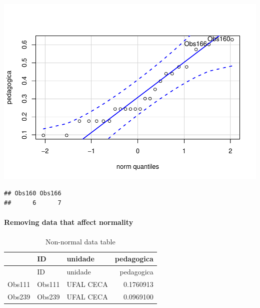 \documentclass[]{article}
\newenvironment{Shaded}{\begin{snugshade}}{\end{snugshade}}
\newcommand{\CommentTok}[1]{\textcolor[rgb]{0.56,0.35,0.01}{\textit{#1}}}
\newcommand{\KeywordTok}[1]{\textcolor[rgb]{0.13,0.29,0.53}{\textbf{#1}}}
\newcommand{\NormalTok}[1]{#1}
\newcommand{\OperatorTok}[1]{\textcolor[rgb]{0.81,0.36,0.00}{\textbf{#1}}}
\newcommand{\StringTok}[1]{\textcolor[rgb]{0.31,0.60,0.02}{#1}}
\let\oldparagraph\paragraph
\renewcommand{\paragraph}[1]{\oldparagraph{#1}\mbox{}}
\begin{document}
\includegraphics{factorialAnova_files/figure-latex/unnamed-chunk-14-1.pdf}

\begin{verbatim}
## Obs160 Obs166 
##      6      7
\end{verbatim}

\hypertarget{removing-data-that-affect-normality}{%
\paragraph{Removing data that affect
normality}\label{removing-data-that-affect-normality}}

\begin{Shaded}
\end{Shaded}

\begin{longtable}[]{@{}lllr@{}}
\caption{Non-normal data table}\tabularnewline
\toprule
& ID & unidade & pedagogica\tabularnewline
\midrule
\endfirsthead
\toprule
& ID & unidade & pedagogica\tabularnewline
\midrule
\endhead
Obs111 & Obs111 & UFAL CECA & 0.1760913\tabularnewline
Obs239 & Obs239 & UFAL CECA & 0.0969100\tabularnewline
\bottomrule
\end{longtable}
\end{document}
